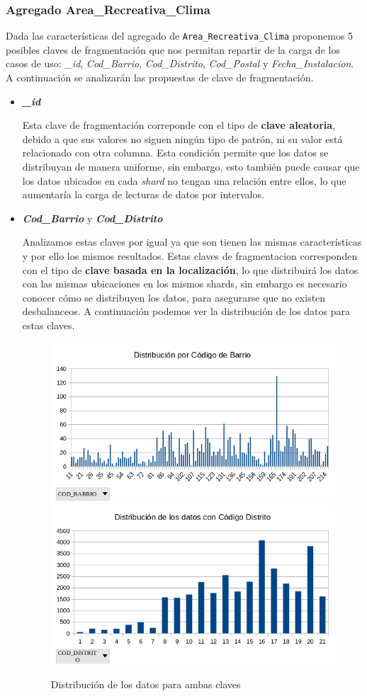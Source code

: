 \documentclass[]{article}
\begin{document}
\subsubsection{Agregado Area\_Recreativa\_Clima}
\label{subsubsec:fragmentacion_area}
Dada las características del agregado de \texttt{Area\_Recreativa\_Clima} proponemos 5 posibles claves de fragmentación que nos permitan repartir de la carga de los casos de uso: \textit{\_id}, \textit{Cod\_Barrio}, \textit{Cod\_Distrito}, \textit{Cod\_Postal} y \textit{Fecha\_Instalacion}. A continuación se analizarán las propuestas de clave de fragmentación.

\begin{itemize}
    \item \textbf{\textit{\_id}}
    
    Esta clave de fragmentación correponde con el tipo de \textbf{clave aleatoria}, debido a que sus valores no siguen ningún tipo de patrón, ni su valor está relacionado con otra columna. Esta condición permite que los datos se distribuyan de manera uniforme, sin embargo, esto también puede causar que los datos ubicados en cada \textit{shard} no tengan una relación entre ellos, lo que aumentaría la carga de lecturas de datos por intervalos.

    \item \textbf{\textit{Cod\_Barrio}} y \textbf{\textit{Cod\_Distrito}}
    
    Analizamos estas claves por igual ya que son tienen las mismas características y por ello los mismos resultados. Estas claves de fragmentacion corresponden con el tipo de \textbf{clave basada en la localización}, lo que distribuirá los datos con las mismas ubicaciones en los mismos shards, sin embargo es necesario conocer cómo se distribuyen los datos, para asegurarse que no existen desbalanceos. A continuación podemos ver la distribución de los datos para estas claves.

    \begin{figure}[H]
        \includegraphics[width=0.45\linewidth]{Distribucion_Cod_Barrio.png}
        \includegraphics[width=0.45\linewidth]{Distribucion_Cod_Distrito.png}
        \caption{Distribución de los datos para ambas claves}
    \end{figure}


\end{itemize}
\end{document}
